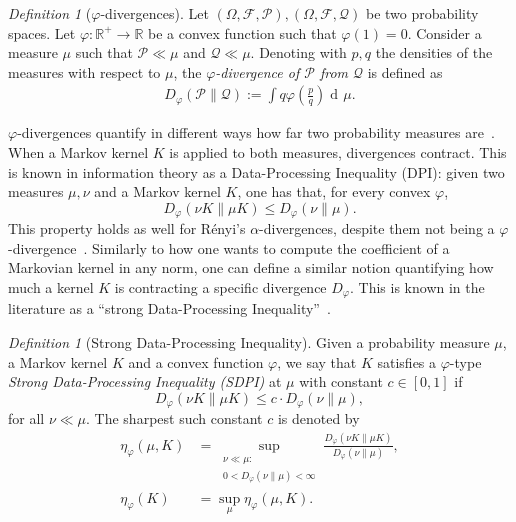 \documentclass[11pt]{article}
\newcommand{\Pm}{\mathcal{P}}
\newcommand{\Q}{\mathcal{Q}}
\newcommand{\F}{\mathcal{F}}
\DeclareMathOperator{\dd}{d\!}
\theoremstyle{plain}
\theoremstyle{remark}
\newtheorem{definition}[theorem]{Definition}
\begin{document}
    \begin{definition}[$\varphi$-divergences]\label{def:fDiv}
		Let $(\Omega,\F,\Pm),(\Omega,\F,\Q)$ be two probability spaces. Let $\varphi:\mathbb{R}^+\to \mathbb{R}$ be a convex function such that $\varphi(1)=0$. Consider a measure $\mu$ such that $\Pm\ll\mu$ and $\Q\ll\mu$. Denoting with $p,q$ the densities of the measures with respect to $\mu$, the \emph{$\varphi$-divergence of $\Pm$ from $\Q$} is defined as %
		\begin{align}
			D_\varphi(\Pm\|\Q):=\int q \varphi\left(\frac{p}{q}\right) \dd\mu.
		\end{align}
	\end{definition} 
    $\varphi$-divergences quantify in different ways how far two probability measures are~\cite{fInformativity}. %
    When a Markov kernel $K$ is applied to both measures, divergences contract. This is known in information theory as a Data-Processing Inequality (DPI): given two measures $\mu,\nu$ and a Markov kernel $K$, one has that, for every convex $\varphi$,
    \begin{equation}
        D_\varphi(\nu K\| \mu K) \leq D_\varphi(\nu\|\mu).\label{eq:DPI}
    \end{equation}
    This property holds as well for R\'enyi's $\alpha$-divergences, despite them not being a $\varphi$-divergence~\cite[Theorem 9]{RenyiKLDiv}.
    Similarly to how one wants to compute the coefficient of a Markovian kernel in any norm, one can define a similar notion quantifying how much a kernel $K$ is contracting a specific divergence $D_\varphi$. 
 This is known in the literature as a ``strong Data-Processing Inequality''~\cite[Definition 3.1]{sdpiRaginsky}.  
    
\begin{definition}[Strong Data-Processing Inequality]\label{def:sdpi}
    Given a probability measure $\mu$, a Markov kernel $K$ and  a convex function $\varphi$, we say that $K$ satisfies a $\varphi$-type \emph{Strong Data-Processing Inequality (SDPI)} at $\mu$ with constant $c\in[0,1]$ if
    \begin{equation}
    D_\varphi(\nu K\|\mu K) \leq c\cdot D_\varphi(\nu\|\mu),
    \end{equation}
    for all $\nu\ll\mu$. The sharpest such constant $c$ is denoted by
\begin{align*}
\eta_\varphi(\mu,K) &= \sup_{\substack{\nu\ll\mu:\\
0<D_\varphi(\nu\|\mu)<\infty}}
\frac{D_\varphi(\nu K\|\mu K) }{D_\varphi(\nu\|\mu)}, \\
\eta_\varphi(K) &= \sup_{\mu} \eta_\varphi(\mu,K).
\end{align*}
\end{definition}
\end{document}
